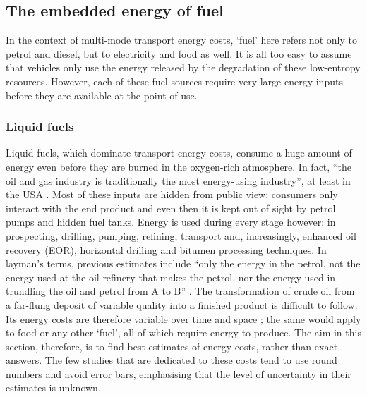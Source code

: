 \documentclass[a4paper, 11pt, twoside]{Thesis}
\begin{document}
\subsection{The embedded energy of fuel} 
\label{sfuelem}
In the context of multi-mode transport energy costs, `fuel' here refers not
only to petrol and diesel, but to electricity and food as well. It is all too easy
to assume that vehicles only use the energy released by the degradation of
these low-entropy resources. However, each of these fuel sources require very
large energy inputs before they are available at the point of use.

\subsubsection{Liquid fuels} 
Liquid fuels, which dominate transport energy costs, consume a huge amount of
energy even before they are burned in the oxygen-rich atmosphere. In fact,
``the oil and gas industry is traditionally the most energy-using industry'',
at least in the USA \citep{Guilford2011}. Most of these
inputs are hidden from public view: consumers only interact with the end
product and even then it is kept out of sight by petrol pumps and hidden fuel
tanks. Energy is used during every stage however: in prospecting, drilling,
pumping, refining, transport and, increasingly, enhanced oil recovery (EOR),
horizontal drilling and bitumen processing techniques. In layman's terms,
previous estimates include ``only the energy in the
petrol, not the energy used at the oil refinery that makes the petrol, nor the
energy used in trundling the oil and petrol from A to B''
\citep[p.~104]{MacKay2009}. The transformation of
crude oil from a far-flung deposit of variable quality into a finished product
is difficult to follow. Its energy costs are therefore variable over time and
space \citep{Cleveland2005}; the same would apply to food or any other `fuel',
all of which require energy to produce. The aim in this section, therefore, is
to find best estimates of energy costs, rather than exact answers. The
few studies that are dedicated to these costs tend to use round numbers and
avoid error bars, emphasising that the level of uncertainty in their estimates
is unknown.
\end{document}
